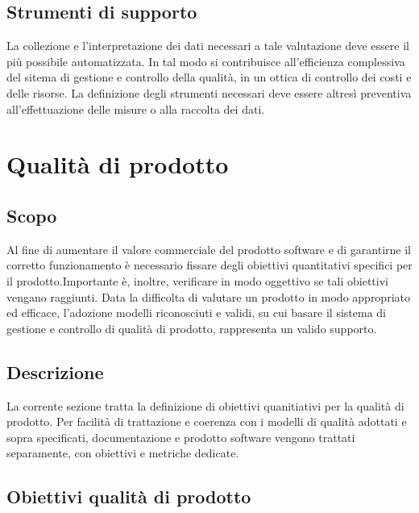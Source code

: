 \documentclass[12pt,a4paper]{article}
\begin{document}
\subsection{Strumenti di supporto}
La collezione e l'interpretazione dei dati necessari a tale valutazione deve essere il più possibile automatizzata. In tal modo si contribuisce all'efficienza complessiva del sitema di gestione e controllo della qualità, in un ottica di controllo dei costi e delle risorse.
La definizione degli strumenti necessari deve essere altresì preventiva all'effettuazione delle misure o alla raccolta dei dati.


\section{Qualità di prodotto}
\subsection{Scopo}
Al fine di aumentare il valore commerciale del prodotto software e di garantirne il corretto funzionamento è necessario fissare degli obiettivi quantitativi specifici per il prodotto.Importante è, inoltre, verificare in modo oggettivo se tali obiettivi vengano raggiunti. Data la difficolta di valutare un prodotto in modo appropriato ed efficace, l'adozione modelli riconosciuti e validi, su cui basare il sistema di gestione e controllo di qualità di prodotto, rappresenta un valido supporto.

\subsection{Descrizione}
La corrente sezione tratta la definizione di obiettivi quanitiativi per la qualità di prodotto. 
Per facilità di trattazione e coerenza con i modelli di qualità adottati e sopra specificati, documentazione e prodotto software vengono trattati separamente, con obiettivi e metriche dedicate.


\subsection{Obiettivi qualità di prodotto}
\end{document}
